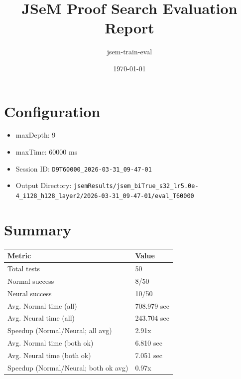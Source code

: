 \documentclass[a4paper,10pt]{article}
\title{JSeM Proof Search Evaluation Report}
\author{jsem-train-eval}
\date{\today}
\begin{document}
\maketitle

\section{Configuration}
\begin{itemize}
\item maxDepth: 9
\item maxTime: 60000 ms
\item Session ID: \texttt{D9T60000\_2026-03-31\_09-47-01}
\item Output Directory: \texttt{jsemResults/jsem\_biTrue\_s32\_lr5.0e-4\_i128\_h128\_layer2/2026-03-31\_09-47-01/eval\_T60000}
\end{itemize}

\section{Summary}
\begin{tabular}{ll}
\toprule
\textbf{Metric} & \textbf{Value} \\
\midrule
Total tests & 50 \\
Normal success & 8/50 \\
Neural success & 10/50 \\
\midrule
Avg. Normal time (all) & 708.979 sec \\
Avg. Neural time (all) & 243.704 sec \\
Speedup (Normal/Neural; all avg) & 2.91x \\
Avg. Normal time (both ok) & 6.810 sec \\
Avg. Neural time (both ok) & 7.051 sec \\
Speedup (Normal/Neural; both ok avg) & 0.97x \\
\bottomrule
\end{tabular}
\end{document}
